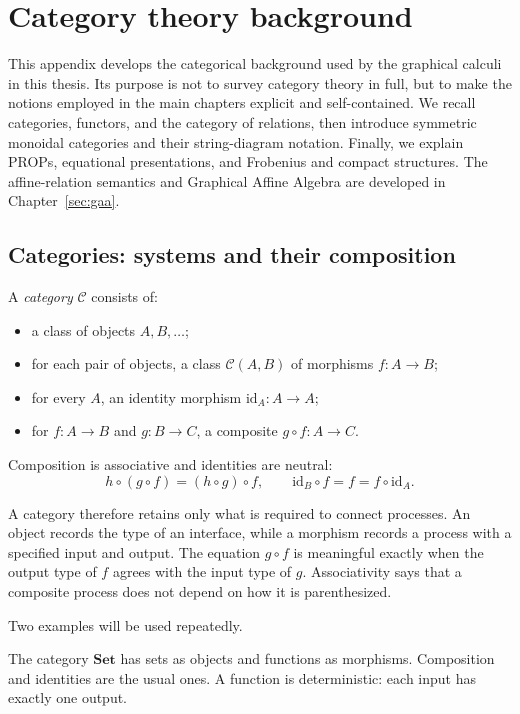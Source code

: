 \chapter{Category theory background}\label{appendix:category-theory}

This appendix develops the categorical background used by the graphical
calculi in this thesis. Its purpose is not to survey category theory in full,
but to make the notions employed in the main chapters explicit and self-contained.
We recall categories, functors, and the category of relations, then introduce
symmetric monoidal categories and their string-diagram notation. Finally,
we explain PROPs, equational presentations, and Frobenius and compact structures.
The affine-relation semantics and Graphical Affine Algebra are developed in
Chapter~\ref{sec:gaa}.

\section{Categories: systems and their composition}\label{appendix:category-basics}

\begin{definition}[Category]
A \emph{category} $\mathcal C$ consists of:
\begin{itemize}
    \item a class of objects $A,B,\ldots$;
    \item for each pair of objects, a class $\mathcal C(A,B)$ of morphisms
          $f:A\to B$;
    \item for every $A$, an identity morphism $\mathrm{id}_A:A\to A$;
    \item for $f:A\to B$ and $g:B\to C$, a composite
          $g\circ f:A\to C$.
\end{itemize}
Composition is associative and identities are neutral:
\[
 h\circ(g\circ f)=(h\circ g)\circ f,
 \qquad
 \mathrm{id}_B\circ f=f=f\circ\mathrm{id}_A.
\]
\end{definition}

A category therefore retains only what is required to connect processes.  An
object records the type of an interface, while a morphism records a process
with a specified input and output.  The equation $g\circ f$ is meaningful
exactly when the output type of $f$ agrees with the input type of $g$.
Associativity says that a composite process does not depend on how it is
parenthesized.

Two examples will be used repeatedly.

\begin{example}[Functions]
The category $\mathbf{Set}$ has sets as objects and functions as morphisms.
Composition and identities are the usual ones.  A function is deterministic:
each input has exactly one output.
\end{example}

